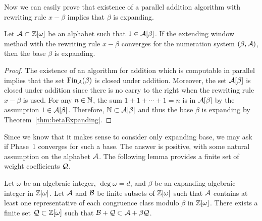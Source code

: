 Now we can easily prove that existence of a parallel addition algorithm with rewriting rule $x-\beta$ implies that $\beta$ is expanding.
\begin{thm}
Let $\mathcal{A}\subset \mathbb{Z}[\omega]$ be an alphabet such that $1\in \mathcal{A}[\beta]$. If the extending window method with the rewriting rule $x-\beta$ converges for the numeration system $(\beta, \mathcal{A})$, then the base $\beta$ is expanding. 
\end{thm}
\begin{proof}
The existence of an algorithm for addition which is computable in parallel implies that the set $\text{Fin}_{\mathcal{A}}(\beta)$ is closed under addition. Moreover, the set $\mathcal{A}[\beta]$ is closed under addition since there is no carry to the right when the rewriting rule $x-\beta$ is used. For any $n\in\mathbb{N}$, the sum $1+1+\cdots +1=n$ is in $\mathcal{A}[\beta]$ by the assumption $1\in \mathcal{A}[\beta]$. Therefore, $\mathbb{N}\subset \mathcal{A}[\beta]$ and thus the base $\beta$ is expanding by Theorem~\ref{thm:betaExpanding}.
\end{proof}


Since we know that it makes sense to consider only expanding base, we may ask if Phase~1 converges for such a base. The answer is positive, with some natural assumption on the alphabet $\mathcal{A}$. The following lemma provides a finite set of weight coefficients $\mathcal{Q}$. 
\begin{lem}
\label{lem:suffCondPhase1}
    Let $\omega$ be an algebraic integer, $\deg \omega=d$, and $\beta$ be an expanding algebraic integer in $\mathbb{Z}[\omega]$. Let $\mathcal{A}$ and $\mathcal{B}$ be finite subsets of $\mathbb{Z}[\omega]$ such that $\mathcal{A}$ contains at least one representative of each congruence class modulo $\beta$ in $\mathbb{Z}[\omega]$. There exists a finite set $\mathcal{Q}\subset\mathbb{Z}[\omega]$  such that $ \mathcal{B} + \mathcal{Q} \subset \mathcal{A} + \beta \mathcal{Q}$.
\end{lem}

